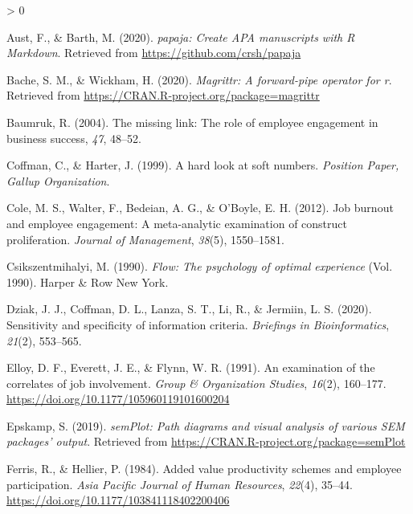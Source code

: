 \documentclass[
  english,
  man]{apa6}
\newlength{\cslhangindent}
\newenvironment{CSLReferences}[2] %
 {%
  \setlength{\parindent}{0pt}
  \ifodd #1 \everypar{\setlength{\hangindent}{\cslhangindent}}\ignorespaces\fi
  \ifnum #2 > 0
  \setlength{\parskip}{#2\baselineskip}
  \fi
 }%
 {}
\begin{document}
\hypertarget{refs}{}
\begin{CSLReferences}{1}{0}
\leavevmode\hypertarget{ref-R-papaja}{}%
Aust, F., \& Barth, M. (2020). \emph{{papaja}: {Create} {APA} manuscripts with {R Markdown}}. Retrieved from \url{https://github.com/crsh/papaja}

\leavevmode\hypertarget{ref-R-magrittr}{}%
Bache, S. M., \& Wickham, H. (2020). \emph{Magrittr: A forward-pipe operator for r}. Retrieved from \url{https://CRAN.R-project.org/package=magrittr}

\leavevmode\hypertarget{ref-baumruk2004missing}{}%
Baumruk, R. (2004). The missing link: The role of employee engagement in business success, \emph{47}, 48--52.

\leavevmode\hypertarget{ref-coffman_hard_1999}{}%
Coffman, C., \& Harter, J. (1999). A hard look at soft numbers. \emph{Position Paper, Gallup Organization}.

\leavevmode\hypertarget{ref-cole2012job}{}%
Cole, M. S., Walter, F., Bedeian, A. G., \& O'Boyle, E. H. (2012). Job burnout and employee engagement: A meta-analytic examination of construct proliferation. \emph{Journal of Management}, \emph{38}(5), 1550--1581.

\leavevmode\hypertarget{ref-csikszentmihalyi1990flow}{}%
Csikszentmihalyi, M. (1990). \emph{Flow: The psychology of optimal experience} (Vol. 1990). Harper \& Row New York.

\leavevmode\hypertarget{ref-dziak2020sensitivity}{}%
Dziak, J. J., Coffman, D. L., Lanza, S. T., Li, R., \& Jermiin, L. S. (2020). Sensitivity and specificity of information criteria. \emph{Briefings in Bioinformatics}, \emph{21}(2), 553--565.

\leavevmode\hypertarget{ref-elloy_examination_1991}{}%
Elloy, D. F., Everett, J. E., \& Flynn, W. R. (1991). An examination of the correlates of job involvement. \emph{Group \& Organization Studies}, \emph{16}(2), 160--177. \url{https://doi.org/10.1177/105960119101600204}

\leavevmode\hypertarget{ref-R-semPlot}{}%
Epskamp, S. (2019). \emph{semPlot: Path diagrams and visual analysis of various SEM packages' output}. Retrieved from \url{https://CRAN.R-project.org/package=semPlot}

\leavevmode\hypertarget{ref-ferris_added_1984}{}%
Ferris, R., \& Hellier, P. (1984). Added value productivity schemes and employee participation. \emph{Asia Pacific Journal of Human Resources}, \emph{22}(4), 35--44. \url{https://doi.org/10.1177/103841118402200406}


\end{CSLReferences}
\end{document}
